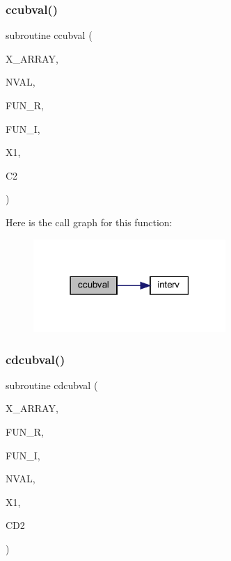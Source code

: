 \subsubsection{\texorpdfstring{ccubval()}{ccubval()}}
{\footnotesize\ttfamily subroutine ccubval (\begin{DoxyParamCaption}\item[{real, dimension(nval)}]{X\+\_\+\+A\+R\+R\+AY,  }\item[{integer}]{N\+V\+AL,  }\item[{real, dimension(4,nval)}]{F\+U\+N\+\_\+R,  }\item[{real, dimension(4,nval)}]{F\+U\+N\+\_\+I,  }\item[{real}]{X1,  }\item[{complex}]{C2 }\end{DoxyParamCaption})}

Here is the call graph for this function\+:\nopagebreak
\begin{figure}[H]
\begin{center}
\leavevmode
\includegraphics[width=207pt]{Leroi__c_8f90_a5a4be24a4461d42dc9be5d5388c4d366_cgraph}
\end{center}
\end{figure}
\mbox{\label{Leroi__c_8f90_ab28d8a79c971f683b68fae4db0553909}} 
\subsubsection{\texorpdfstring{cdcubval()}{cdcubval()}}
{\footnotesize\ttfamily subroutine cdcubval (\begin{DoxyParamCaption}\item[{real, dimension(nval)}]{X\+\_\+\+A\+R\+R\+AY,  }\item[{real, dimension(4,nval)}]{F\+U\+N\+\_\+R,  }\item[{real, dimension(4,nval)}]{F\+U\+N\+\_\+I,  }\item[{integer}]{N\+V\+AL,  }\item[{real(kind=ql)}]{X1,  }\item[{complex(kind=ql)}]{C\+D2 }\end{DoxyParamCaption})}

